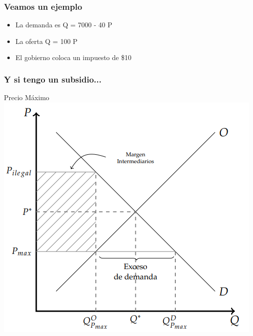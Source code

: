 \documentclass{beamer}
\begin{document}
\begin{frame}
\frametitle{Veamos un ejemplo}
\begin{itemize}
    \item La demanda es Q = 7000 - 40 P 
    \item La oferta Q = 100 P
    \item El gobierno coloca un impuesto de \$10
\end{itemize}
\end{frame}

\begin{frame}
\frametitle{Y si tengo un subsidio...}

\end{frame}

\begin{frame}{Precio Máximo}
    \centering
    \includegraphics[scale=0.7]{../Figures/C24.5.png}
\end{frame}
\end{document}
